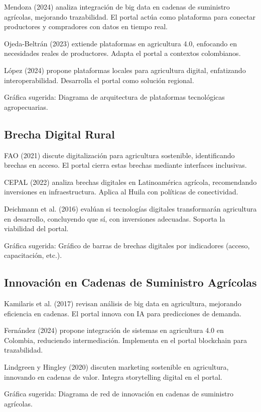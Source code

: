 Mendoza (2024) analiza integración de big data en cadenas de suministro agrícolas, mejorando trazabilidad. El portal actúa como plataforma para conectar productores y compradores con datos en tiempo real.

Ojeda-Beltrán (2023) extiende plataformas en agricultura 4.0, enfocando en necesidades reales de productores. Adapta el portal a contextos colombianos.

López (2024) propone plataformas locales para agricultura digital, enfatizando interoperabilidad. Desarrolla el portal como solución regional.

Gráfica sugerida: Diagrama de arquitectura de plataformas tecnológicas agropecuarias.

\subsection{Brecha Digital Rural}

FAO (2021) discute digitalización para agricultura sostenible, identificando brechas en acceso. El portal cierra estas brechas mediante interfaces inclusivas.

CEPAL (2022) analiza brechas digitales en Latinoamérica agrícola, recomendando inversiones en infraestructura. Aplica al Huila con políticas de conectividad.

Deichmann et al. (2016) evalúan si tecnologías digitales transformarán agricultura en desarrollo, concluyendo que sí, con inversiones adecuadas. Soporta la viabilidad del portal.

Gráfica sugerida: Gráfico de barras de brechas digitales por indicadores (acceso, capacitación, etc.).

\subsection{Innovación en Cadenas de Suministro Agrícolas}

Kamilaris et al. (2017) revisan análisis de big data en agricultura, mejorando eficiencia en cadenas. El portal innova con IA para predicciones de demanda.

Fernández (2024) propone integración de sistemas en agricultura 4.0 en Colombia, reduciendo intermediación. Implementa en el portal blockchain para trazabilidad.

Lindgreen y Hingley (2020) discuten marketing sostenible en agricultura, innovando en cadenas de valor. Integra storytelling digital en el portal.

Gráfica sugerida: Diagrama de red de innovación en cadenas de suministro agrícolas.